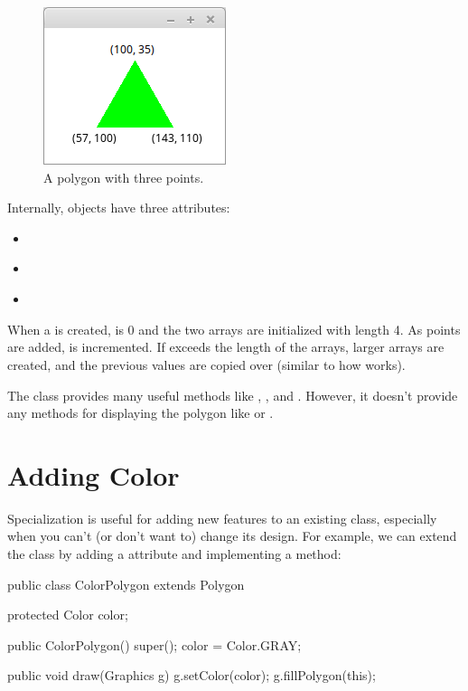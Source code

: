 \begin{figure}[!ht]
\begin{center}
\includegraphics{figs/triangle.png}
\caption{A polygon with three points.}
\label{fig:triangle}
\end{center}
\end{figure}

Internally,  objects have three attributes:

\begin{itemize}
\item {} {\tt ~~~} 
\item {} {\tt ~} 
\item {} {\tt ~} 
\end{itemize}

When a  is created,  is 0 and the two arrays are initialized with length 4.
As points are added,  is incremented.
If  exceeds the length of the arrays, larger arrays are created, and the previous values are copied over (similar to how  works).

The  class provides many useful methods like , , and .
However, it doesn't provide any methods for displaying the polygon like  or .


\section{Adding Color}

Specialization is useful for adding new features to an existing class, especially when you can't (or don't want to) change its design.
For example, we can extend the  class by adding a  attribute and implementing a  method:

\begin{code}
public class ColorPolygon extends Polygon {
    protected Color color;

    public ColorPolygon() {
        super();
        color = Color.GRAY;
    }
    
    public void draw(Graphics g) {
        g.setColor(color);
        g.fillPolygon(this);
    }
}
\end{code}

